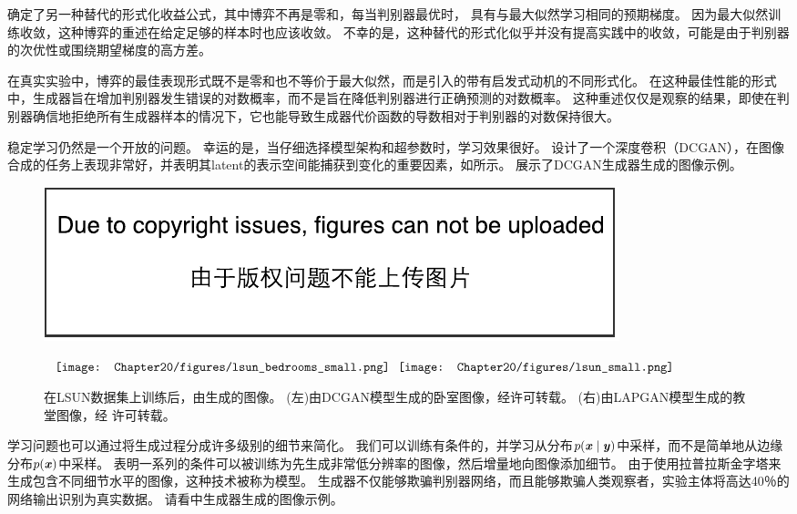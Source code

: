 \citet{Goodfellow-ICLR2015} 确定了另一种替代的形式化收益公式，其中博弈不再是零和，每当判别器最优时， 具有与最大似然学习相同的预期梯度。
因为最大似然训练收敛，这种博弈的重述在给定足够的样本时也应该收敛。
不幸的是，这种替代的形式化似乎并没有提高实践中的收敛，可能是由于判别器的次优性或围绕期望梯度的高方差。


在真实实验中，博弈的最佳表现形式既不是零和也不等价于最大似然，而是\citet{Goodfellow-et-al-NIPS2014-small}引入的带有启发式动机的不同形式化。
在这种最佳性能的形式中，生成器旨在增加判别器发生错误的对数概率，而不是旨在降低判别器进行正确预测的对数概率。
这种重述仅仅是观察的结果，即使在判别器确信地拒绝所有生成器样本的情况下，它也能导致生成器代价函数的导数相对于判别器的对数保持很大。

稳定学习仍然是一个开放的问题。
幸运的是，当仔细选择模型架构和超参数时，学习效果很好。
\citet{radford2015unsupervised}设计了一个深度卷积（DCGAN），在图像合成的任务上表现非常好，并表明其\gls{latent}的表示空间能捕获到变化的重要因素，如所示。
展示了DCGAN生成器生成的图像示例。
 
\begin{figure}[!htb]
\ifOpenSource
\centerline{\includegraphics{figure.pdf}}
\else
\centering
$\vcenter{\hbox{
\texttt{[image: Chapter20/figures/lsun\_bedrooms\_small.png]}
}}
\vcenter{\hbox{
\texttt{[image: Chapter20/figures/lsun\_small.png]}
}}$
\fi
\caption{在LSUN数据集上训练后，由生成的图像。
(左)由DCGAN模型生成的卧室图像，经\citet{radford2015unsupervised}许可转载。
(右)由LAPGAN模型生成的教堂图像，经 \citet{denton2015deep}许可转载。
}
\label{fig:chap20_lsun_small}
\end{figure}

学习问题也可以通过将生成过程分成许多级别的细节来简化。
我们可以训练有条件的\citep{mirza2014conditional}，并学习从分布$p(\boldsymbol{\mathit{x}} \mid \boldsymbol{\mathit{y}})$中采样，而不是简单地从边缘分布$p(\boldsymbol{\mathit{x}})$中采样。
\citet{denton2015deep} 表明一系列的条件可以被训练为先生成非常低分辨率的图像，然后增量地向图像添加细节。
由于使用拉普拉斯金字塔来生成包含不同细节水平的图像，这种技术被称为模型。
生成器不仅能够欺骗判别器网络，而且能够欺骗人类观察者，实验主体将高达40％的网络输出识别为真实数据。
请看中生成器生成的图像示例。


